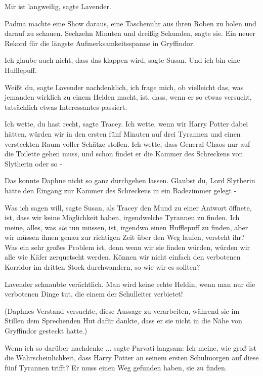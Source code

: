 \glqq Mir ist langweilig\grqq{}, sagte Lavender.

Padma machte eine Show daraus, eine Taschenuhr aus ihren Roben zu holen und
darauf zu schauen. \glqq Sechzehn Minuten und dreißig Sekunden\grqq{}, sagte
sie. \glqq Ein neuer Rekord für die längste Aufmerksamkeitsspanne in
Gryffindor.\grqq{}

\glqq Ich glaube auch nicht, dass das klappen wird\grqq{}, sagte Susan. \glqq
Und ich bin eine Hufflepuff.\grqq{}

\glqq Weißt du\grqq{}, sagte Lavender nachdenklich, \glqq ich frage mich, ob
vielleicht das, was jemanden wirklich zu einem Helden macht, ist, dass, wenn er
so etwas versucht, tatsächlich etwas Interessantes passiert.\grqq{}

\glqq Ich wette, du hast recht\grqq{}, sagte Tracey. \glqq Ich wette, wenn wir
Harry Potter dabei hätten, würden wir in den ersten fünf Minuten auf drei
Tyrannen und einen versteckten Raum voller Schätze stoßen. Ich wette, dass
General Chaos nur auf die Toilette gehen muss, und schon findet er die Kammer
des Schreckens von Slytherin oder so -\grqq{}

Das konnte Daphne nicht so ganz durchgehen lassen. \glqq Glaubst du, Lord
Slytherin hätte den Eingang zur Kammer des Schreckens in ein Badezimmer gelegt
-\grqq{}

\glqq Was ich sagen will\grqq{}, sagte Susan, als Tracey den Mund zu einer
Antwort öffnete, \glqq ist, dass wir keine Möglichkeit haben, irgendwelche
Tyrannen zu finden. Ich meine, alles, was \emph{sie} tun müssen, ist, irgendwo
einen Hufflepuff zu finden, aber wir müssen ihnen genau zur richtigen Zeit über
den Weg laufen, versteht ihr? Was ein sehr großes Problem ist, denn wenn wir sie
finden würden, würden wir alle wie Käfer zerquetscht werden. Können wir nicht
einfach den verbotenen Korridor im dritten Stock durchwandern, so wie wir es
sollten?\grqq{}

Lavender schnaubte verächtlich. \glqq Man wird keine echte Heldin, wenn man nur
die verbotenen Dinge tut, die einem der Schulleiter verbietet!\grqq{}

(Daphnes Verstand versuchte, diese Aussage zu verarbeiten, während sie im
Stillen dem Sprechenden Hut dafür dankte, dass er sie nicht in die Nähe von
Gryffindor gesteckt hatte.)

\glqq Wenn ich so darüber nachdenke ...\grqq{} sagte Parvati langsam: \glqq Ich
meine, wie groß ist die Wahrscheinlichkeit, dass Harry Potter an seinem ersten
Schulmorgen auf diese fünf Tyrannen trifft? Er muss einen Weg gefunden haben,
sie zu finden.\grqq{}

